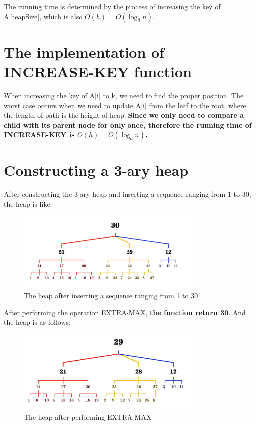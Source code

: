 \documentclass{article}
\begin{document}
The running time is determined by the process of increasing the key of A[heapSize], 
which is also $O(h) = O(\log_d n)$.

\section{The implementation of INCREASE-KEY function}

 

When increasing the key of A[i] to k, we need to find the proper position. 
The worst case occurs when we need to update A[i] from the leaf to the root,
where the length of path is the height of heap. 
\textbf{Since we only need to compare a child with its parent node for only once,
therefore the running time of INCREASE-KEY 
is $O(h) = O(\log_d n)$.}

\section{Constructing a 3-ary heap}
After constructing the 3-ary heap and inserting a sequence ranging from 1 to 30,
the heap is like:
\begin{figure}[H]
    \centering  %
    \includegraphics[width=0.8\textwidth]{result1}
    \caption{The heap after inserting a sequence ranging from 1 to 30}
\end{figure}

After performing the operation EXTRA-MAX, \textbf{the function return 30}. 
And the heap is as follows:
\begin{figure}[H]
    \centering  %
    \includegraphics[width=0.8\textwidth]{result2}
    \caption{The heap after performing EXTRA-MAX}
\end{figure}
\end{document}
